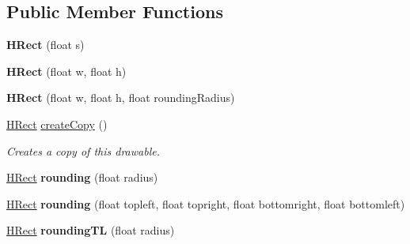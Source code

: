 \subsection*{Public Member Functions}
\begin{DoxyCompactItemize}
\item 
\hypertarget{classhype_1_1extended_1_1drawable_1_1_h_rect_a78bf1b1c0ed63f83811a28805886b18c}{{\bfseries H\-Rect} (float s)}\label{classhype_1_1extended_1_1drawable_1_1_h_rect_a78bf1b1c0ed63f83811a28805886b18c}

\item 
\hypertarget{classhype_1_1extended_1_1drawable_1_1_h_rect_a5566eae4264f205265c59a6c8e79f867}{{\bfseries H\-Rect} (float w, float h)}\label{classhype_1_1extended_1_1drawable_1_1_h_rect_a5566eae4264f205265c59a6c8e79f867}

\item 
\hypertarget{classhype_1_1extended_1_1drawable_1_1_h_rect_abe11f4aa672cb26f906999310a7447ef}{{\bfseries H\-Rect} (float w, float h, float rounding\-Radius)}\label{classhype_1_1extended_1_1drawable_1_1_h_rect_abe11f4aa672cb26f906999310a7447ef}

\item 
\hyperlink{classhype_1_1extended_1_1drawable_1_1_h_rect}{H\-Rect} \hyperlink{classhype_1_1extended_1_1drawable_1_1_h_rect_acf678ec20a13f2bbf2befd1110234e2c}{create\-Copy} ()
\begin{DoxyCompactList}\small\item\em Creates a copy of this drawable. \end{DoxyCompactList}\item 
\hypertarget{classhype_1_1extended_1_1drawable_1_1_h_rect_aee2ab04d2ff50abe87c0622aa870bd88}{\hyperlink{classhype_1_1extended_1_1drawable_1_1_h_rect}{H\-Rect} {\bfseries rounding} (float radius)}\label{classhype_1_1extended_1_1drawable_1_1_h_rect_aee2ab04d2ff50abe87c0622aa870bd88}

\item 
\hypertarget{classhype_1_1extended_1_1drawable_1_1_h_rect_ade308b69a8b6ac1c03d8e0e5f2dcc0ee}{\hyperlink{classhype_1_1extended_1_1drawable_1_1_h_rect}{H\-Rect} {\bfseries rounding} (float topleft, float topright, float bottomright, float bottomleft)}\label{classhype_1_1extended_1_1drawable_1_1_h_rect_ade308b69a8b6ac1c03d8e0e5f2dcc0ee}

\item 
\hypertarget{classhype_1_1extended_1_1drawable_1_1_h_rect_a3dbebef6e54ba3c87be895d9e47fd8c4}{\hyperlink{classhype_1_1extended_1_1drawable_1_1_h_rect}{H\-Rect} {\bfseries rounding\-T\-L} (float radius)}\label{classhype_1_1extended_1_1drawable_1_1_h_rect_a3dbebef6e54ba3c87be895d9e47fd8c4}


\end{DoxyCompactItemize}
